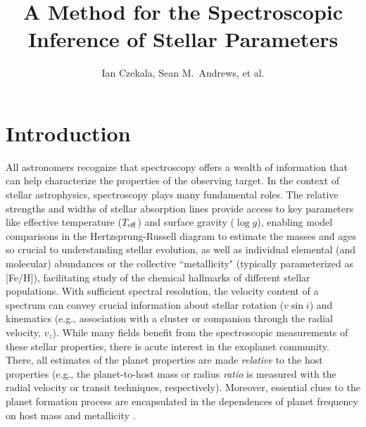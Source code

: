 \documentclass[iop,floatfix]{emulateapj}
\begin{document}
\graphicspath{{figs/}}



\title{A Method for the Spectroscopic Inference of Stellar Parameters}
\author{Ian Czekala, Sean M.~Andrews, et al.}

\section{Introduction} \label{sec:intro}

All astronomers recognize that spectroscopy offers a wealth of information that can help
characterize the properties of the observing target.  In the context of stellar astrophysics, 
spectroscopy plays many fundamental roles.  The relative strengths and widths of stellar absorption 
lines provide access to key parameters like effective temperature ($T_{\rm eff}$) and surface 
gravity ($\log g$), enabling model comparisons in the Hertzsprung-Russell diagram to estimate the 
masses and ages so crucial to understanding stellar evolution, as well as individual elemental (and 
molecular) abundances or the collective ``metallicity" (typically parameterized as [Fe/H]), 
facilitating study of the chemical hallmarks of different stellar populations.  With sufficient 
spectral resolution, the velocity content of a spectrum can convey crucial information about 
stellar rotation ($v \sin i$) and kinematics (e.g., association with a cluster or companion through 
the radial velocity, $v_z$).  While many fields benefit from the spectroscopic measurements of 
these stellar properties, there is acute interest in the exoplanet community.  There, all estimates 
of the planet properties are made {\it relative} to the host properties (e.g., the planet-to-host 
mass or radius {\it ratio} is measured with the radial velocity or transit techniques, 
respectively).  Moreover, essential clues to the planet formation process are encapsulated in the 
dependences of planet frequency on host mass \citep[e.g.,][]{johnson07,howard10} and metallicity 
\citep[e.g.,][]{fischer05,buchhave14}.   
\end{document}
